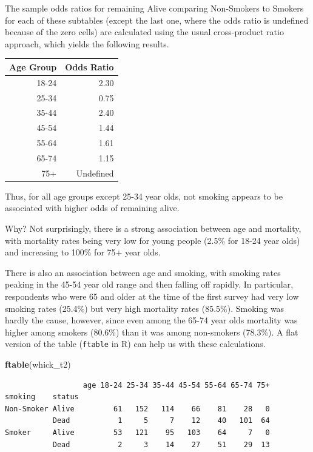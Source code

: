 \documentclass[
]{book}
\newenvironment{Shaded}{\begin{snugshade}}{\end{snugshade}}
\newcommand{\KeywordTok}[1]{\textcolor[rgb]{0.13,0.29,0.53}{\textbf{#1}}}
\newcommand{\NormalTok}[1]{#1}
\begin{document}
The sample odds ratios for remaining Alive comparing Non-Smokers to Smokers for each of these subtables (except the last one, where the odds ratio is undefined because of the zero cells) are calculated using the usual cross-product ratio approach, which yields the following results.

\begin{longtable}[]{@{}rr@{}}
\toprule
Age Group & Odds Ratio\tabularnewline
\midrule
\endhead
18-24 & 2.30\tabularnewline
25-34 & 0.75\tabularnewline
35-44 & 2.40\tabularnewline
45-54 & 1.44\tabularnewline
55-64 & 1.61\tabularnewline
65-74 & 1.15\tabularnewline
75+ & Undefined\tabularnewline
\bottomrule
\end{longtable}

Thus, for all age groups except 25-34 year olds, not smoking appears to be associated with higher odds of remaining alive.

Why? Not surprisingly, there is a strong association between age and mortality, with mortality rates being very low for young people (2.5\% for 18-24 year olds) and increasing to 100\% for 75+ year olds.

There is also an association between age and smoking, with smoking rates peaking in the 45-54 year old range and then falling off rapidly. In particular, respondents who were 65 and older at the time of the first survey had very low smoking rates (25.4\%) but very high mortality rates (85.5\%). Smoking was hardly the cause, however, since even among the 65-74 year olds mortality was higher among smokers (80.6\%) than it was among non-smokers (78.3\%). A flat version of the table (\texttt{ftable} in R) can help us with these calculations.

\begin{Shaded}
\begin{Highlighting}[]
\KeywordTok{ftable}\NormalTok{(whick_t2)}
\end{Highlighting}
\end{Shaded}

\begin{verbatim}
                  age 18-24 25-34 35-44 45-54 55-64 65-74 75+
smoking    status                                            
Non-Smoker Alive         61   152   114    66    81    28   0
           Dead           1     5     7    12    40   101  64
Smoker     Alive         53   121    95   103    64     7   0
           Dead           2     3    14    27    51    29  13
\end{verbatim}
\end{document}
